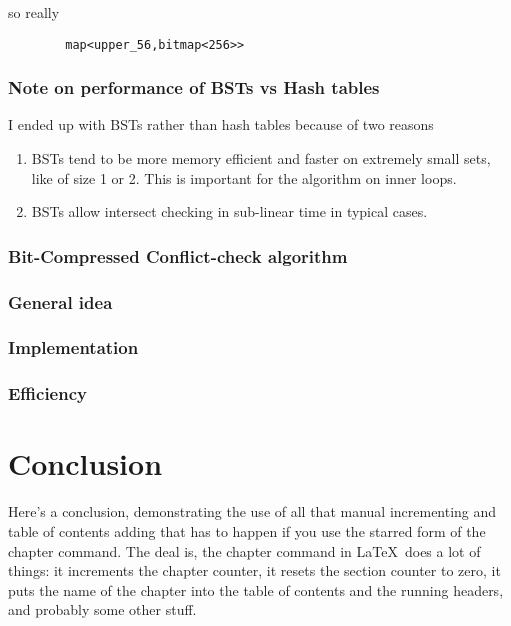 \documentclass[12pt,twoside]{reedthesis}
\begin{document}
		so really
		
		\begin{verbatim}
		map<upper_56,bitmap<256>>
		\end{verbatim}
		
		
		\subsection{Note on performance of BSTs vs Hash tables}
		
		I ended up with BSTs rather than hash tables because of two reasons
		\begin{enumerate}
			\item BSTs tend to be more memory efficient and faster on extremely small sets, like of size 1 or 2. This is important for the algorithm on inner loops. 
			\item BSTs allow intersect checking in sub-linear time in typical cases.
		\end{enumerate}
	
		
		
	\subsection{Bit-Compressed Conflict-check algorithm}
		
		\subsection{General idea}
		
		\subsection{Implementation}
		
		\subsection{Efficiency}
		

\chapter*{Conclusion}
	\setcounter{chapter}{4}
	\setcounter{section}{0}
	
Here's a conclusion, demonstrating the use of all that manual incrementing and table of contents adding that has to happen if you use the starred form of the chapter command. The deal is, the chapter command in \LaTeX\ does a lot of things: it increments the chapter counter, it resets the section counter to zero, it puts the name of the chapter into the table of contents and the running headers, and probably some other stuff. 
\end{document}
